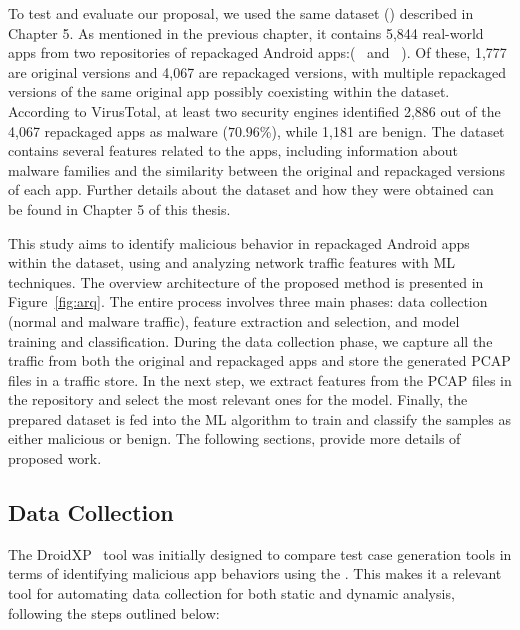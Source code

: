 
To test and evaluate our proposal, we used the same dataset (\cds) described in Chapter 5. As mentioned in the previous chapter, it contains 5,844 real-world apps from two repositories of repackaged Android apps:(\repack~\cite{DBLP:journals/tse/LiBK21} and \amc~\cite{rafiq2022andromalpack}). Of these, 1,777 are original versions and 4,067 are repackaged versions, with multiple repackaged versions of the same original app possibly coexisting within the \cds dataset. According to VirusTotal, at least two security engines identified 2,886 out of the 4,067 repackaged apps as malware ($70.96$\%), while 1,181 are benign. The \cds dataset contains several features related to the apps, including information about malware families and the similarity between the original and repackaged versions of each app. Further details about the \cds dataset and how they were obtained can be found in Chapter 5 of this thesis.

This study aims to identify malicious behavior in repackaged Android apps within the \cds dataset, using \droidxpflow and analyzing network traffic features with ML techniques. The overview architecture of the proposed method is presented in Figure~\ref{fig:arq}. The entire process involves three main phases: data collection (normal and malware traffic), feature extraction and selection, and model training and classification. During the data collection phase, we capture all the traffic from both the original and repackaged apps and store the generated PCAP files in a traffic store. In the next step, we extract features from the PCAP files in the repository and select the most relevant ones for the model. Finally, the prepared dataset is fed into the ML algorithm to train and classify the samples as either malicious or benign. The following sections, provide more details of proposed work.


\subsection{Data Collection}\label{sec:data}

The DroidXP~\cite{DBLP:conf/scam/CostaMCMVBC20} tool was initially designed to compare test case generation tools in terms of identifying malicious app behaviors using the \mas. This makes it a relevant tool for automating data collection for both static and dynamic analysis, following the steps outlined below:


